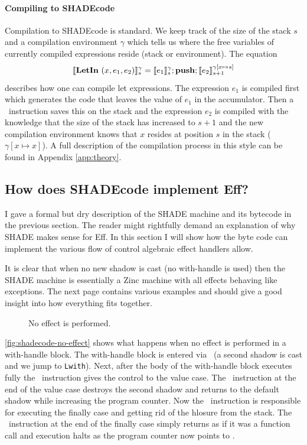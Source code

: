 \documentclass[class=article, crop=false]{standalone}
\begin{document}
\paragraph{Compiling to SHADEcode}

Compilation to SHADEcode is standard. We keep track of the size of the stack
$s$ and a compilation environment $\gamma$ which tells us where the free
variables of currently compiled expressions reside (stack or environment).
The equation
$$ \llbracket \mathbf{LetIn}\ (x, e_1, e_2) \rrbracket_s^\gamma = \llbracket e_1 \rrbracket_s^\gamma; \textbf{push}; \llbracket e_2 \rrbracket_{s+1}^{\gamma[x \mapsto s]} $$
describes how one can compile let expressions. The expression $e_1$ is compiled
first which generates the code that leaves the value of $e_1$ in the accumulator.
Then a \vmPush\ instruction saves this on the stack and the expression $e_2$ is
compiled with the knowledge that the size of the stack has increased to $s+1$
and the new compilation environment knows that $x$ resides at position $s$ in
the stack ($\gamma[x \mapsto x]$). A full description of the compilation process
in this style can be found in Appendix \autoref{app:theory}.

\subsection{How does SHADEcode implement Eff?}
\label{sec:shade-illustration}

I gave a formal but dry description of the SHADE machine and its bytecode in
the previous section. The reader might rightfully demand an explanation of why
SHADE makes sense for Eff. In this section I will show how the byte code can
implement the various flow of control algebraic effect handlers allow.

It is clear that when no new shadow is cast (no with-handle is used) then the
SHADE machine is essentially a Zinc \cite{leroy1990zinc} machine with all
effects behaving like exceptions. The next page contains various examples and
should give a good insight into how everything fits together.

\begin{figure}
    \centering
    \caption{No effect is performed.}
    \label{fig:shadecode-no-effect}
\end{figure}

\autoref{fig:shadecode-no-effect} shows what happens when no effect is performed
in a with-handle block. The with-handle block is entered via \vmCastShadow\
(a second shadow is cast and we jump to \lstinline{Lwith}). Next, after the
body of the with-handle block executes fully the \vmKillShadow\ instruction
gives the control to the value case. The \vmRett\ instruction at the end of
the value case destroys the second shadow and returns to the default shadow
while increasing the program counter. Now the \vmFin\ instruction is responsible
for executing the finally case and getting rid of the hlosure from the stack.
The \vmRet\ instruction at the end of the finally case simply returns as if it
was a function call and execution halts as the program counter now points to
\vmHalt.
\end{document}
